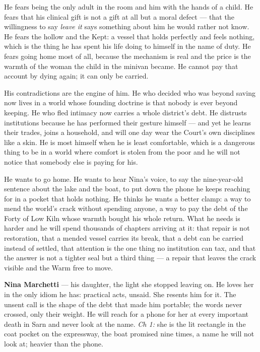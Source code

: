 \documentclass{design/chronicle}
\begin{document}
{He fears being the only adult in the room and him with the hands of a child. He fears that his clinical gift is not a gift at all but a moral defect — that the willingness to say \emph{leave it} says something about him he would rather not know. He fears the hollow and the Kept: a vessel that holds perfectly and feels nothing, which is the thing he has spent his life doing to himself in the name of duty. He fears going home most of all, because the mechanism is real and the price is the warmth of the woman the child in the minivan became. He cannot pay that account by dying again; it can only be carried.

His contradictions are the engine of him. He who decided who was beyond saving now lives in a world whose founding doctrine is that nobody is ever beyond keeping. He who fled intimacy now carries a whole district’s debt. He distrusts institutions because he has performed their gesture himself — and yet he learns their trades, joins a household, and will one day wear the Court’s own disciplines like a skin. He is most himself when he is least comfortable, which is a dangerous thing to be in a world where comfort is stolen from the poor and he will not notice that somebody else is paying for his.

He wants to go home. He wants to hear Nina’s voice, to say the nine-year-old sentence about the lake and the boat, to put down the phone he keeps reaching for in a pocket that holds nothing. He thinks he wants a better clamp: a way to mend the world’s crack without spending anyone, a way to pay the debt of the Forty of Low Kiln whose warmth bought his whole return. What he needs is harder and he will spend thousands of chapters arriving at it: that repair is not restoration, that a mended vessel carries its break, that a debt can be carried instead of settled, that attention is the one thing no institution can tax, and that the answer is not a tighter seal but a third thing — a repair that leaves the crack visible and the Warm free to move.

\textbf{Nina Marchetti} — his daughter, the light she stopped leaving on. He loves her in the only idiom he has: practical acts, unsaid. She resents him for it. The unsent call is the shape of the debt that made him portable; the words never crossed, only their weight. He will reach for a phone for her at every important death in Sarn and never look at the name. \emph{Ch 1:} she is the lit rectangle in the coat pocket on the expressway, the boat promised nine times, a name he will not look at; heavier than the phone.

}
\end{document}
